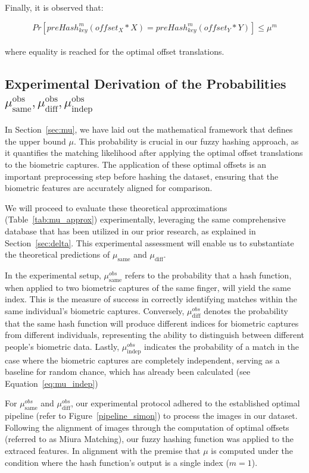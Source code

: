 Finally, it is observed that:

\begin{equation}
    Pr[preHash_{key}^m(offset_X * X) = preHash_{key}^m(offset_Y * Y)] \leq \mu^m
\end{equation}
\\
where equality is reached for the optimal offset translations.

\subsection{Experimental Derivation of the Probabilities \(\mu_{\text{same}}^{\text{obs}}, \mu_{\text{diff}}^{\text{obs}}, \mu_{\text{indep}}^{\text{obs}}\)}

In Section~\ref{sec:mu}, we have laid out the mathematical framework that defines the upper bound \(\mu\). This probability is crucial in our fuzzy hashing approach, as it quantifies the matching likelihood after applying the optimal offset translations to the biometric captures. The application of these optimal offsets is an important preprocessing step before hashing the dataset, ensuring that the biometric features are accurately aligned for comparison.

We will proceed to evaluate these theoretical approximations (Table~\ref{tab:mu_approx}) experimentally, leveraging the same comprehensive database that has been utilized in our prior research, as explained in Section~\ref{sec:delta}. This experimental assessment will enable us to substantiate the theoretical predictions of \(\mu_{\text{same}}\) and \(\mu_{\text{diff}}\).

In the experimental setup, \(\mu^{obs}_{\text{same}}\) refers to the probability that a hash function, when applied to two biometric captures of the same finger, will yield the same index. This is the measure of success in correctly identifying matches within the same individual's biometric captures. Conversely, \(\mu^{obs}_{\text{diff}}\) denotes the probability that the same hash function will produce different indices for biometric captures from different individuals, representing the ability to distinguish between different people's biometric data. Lastly, \(\mu^{obs}_{\text{indep}}\) indicates the probability of a match in the case where the biometric captures are completely independent, serving as a baseline for random chance, which has already been calculated (see Equation~\ref{eq:mu_indep})

For \(\mu_{\text{same}}^{obs}\) and \(\mu_{\text{diff}}^{obs}\), our experimental protocol adhered to the established optimal pipeline (refer to Figure~\ref{pipeline_simon}) to process the images in our dataset. Following the alignment of images through the computation of optimal offsets (referred to as Miura Matching), our fuzzy hashing function was applied to the extraced features. In alignment with the premise that \(\mu\) is computed under the condition where the hash function's output is a single index (\(m=1\)).

